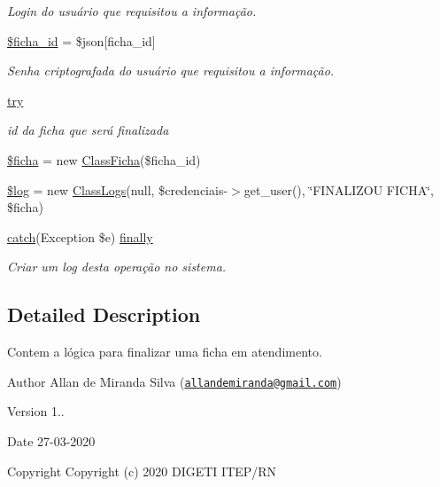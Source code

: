 \begin{DoxyCompactItemize}
\begin{DoxyCompactList}\small\item\em Login do usuário que requisitou a informação. \end{DoxyCompactList}\item 
\hyperlink{finalizar_8php_a6224af2851adb741887322ddb4c77102}{\$ficha\+\_\+id} = \$json\mbox{[}\textquotesingle{}ficha\+\_\+id\textquotesingle{}\mbox{]}
\begin{DoxyCompactList}\small\item\em Senha criptografada do usuário que requisitou a informação. \end{DoxyCompactList}\item 
\hyperlink{finalizar_8php_abe4cc9788f52e49485473dc699537388}{try}
\begin{DoxyCompactList}\small\item\em id da ficha que será finalizada \end{DoxyCompactList}\item 
\hyperlink{finalizar_8php_aab83e7ad10d8c95fdbf231d086b83a1f}{\$ficha} = new \hyperlink{class_class_ficha}{Class\+Ficha}(\$ficha\+\_\+id)
\item 
\hyperlink{finalizar_8php_a9a2cf15a653aee8be437f7ae474cd494}{\$log} = new \hyperlink{class_class_logs}{Class\+Logs}(null, \$credenciais-\/$>$get\+\_\+user(), \char`\"{}F\+I\+N\+A\+L\+I\+Z\+OU F\+I\+C\+HA\char`\"{}, \$ficha)
\item 
\hyperlink{imprimir_2ficha_2index_8php_a8104793004944f01dd070fc8b1ade3c4}{catch}(Exception \$e) \hyperlink{finalizar_8php_a1eb47d68a4a4f73debf91b15e179d813}{finally}
\begin{DoxyCompactList}\small\item\em Criar um log desta operação no sistema. \end{DoxyCompactList}\end{DoxyCompactItemize}


\subsection{Detailed Description}
Contem a lógica para finalizar uma ficha em atendimento. 

\begin{DoxyAuthor}{Author}
Allan de Miranda Silva (\href{mailto:allandemiranda@gmail.com}{\tt allandemiranda@gmail.\+com}) 
\end{DoxyAuthor}
\begin{DoxyVersion}{Version}
1.. 
\end{DoxyVersion}
\begin{DoxyDate}{Date}
27-\/03-\/2020
\end{DoxyDate}
\begin{DoxyCopyright}{Copyright}
Copyright (c) 2020 D\+I\+G\+E\+TI I\+T\+E\+P/\+RN 
\end{DoxyCopyright}


